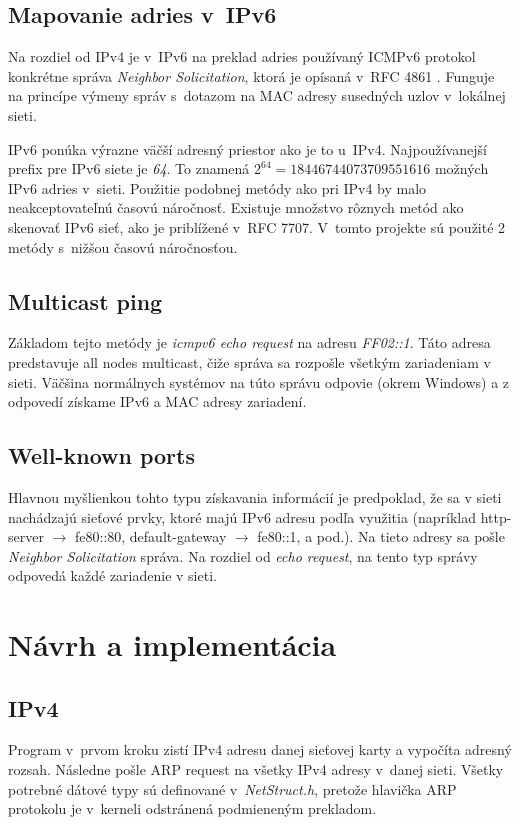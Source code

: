 \documentclass[a4paper, 11pt]{article}
\begin{document}
\subsection{Mapovanie adries v~IPv6}
Na rozdiel od IPv4 je v~IPv6 na preklad adries používaný ICMPv6 protokol konkrétne správa \emph{Neighbor Solicitation}, ktorá je opísaná v~RFC 4861 \cite{ns}. Funguje na princípe výmeny správ s~dotazom na MAC adresy susedných uzlov v~lokálnej sieti. 

IPv6 ponúka výrazne väčší adresný priestor ako je to u~IPv4. Najpoužívanejší prefix pre IPv6 siete je \emph{64}. To znamená $2^{64} = 18446744073709551616$ možných IPv6 adries v~sieti. Použitie podobnej metódy ako pri IPv4 by malo neakceptovateľnú časovú náročnosť. Existuje množstvo rôznych metód ako skenovať IPv6 sieť, ako je priblížené v~RFC 7707. \cite{net_rec} V~tomto projekte sú použité 2 metódy s~nižšou časovú náročnosťou.

\subsection{Multicast ping}
Základom tejto metódy je \emph{icmpv6 echo request} na adresu \emph{FF02::1}. Táto adresa predstavuje all nodes multicast, čiže správa sa rozpošle všetkým zariadeniam v sieti. \cite{multicast} Väčšina normálnych systémov na túto správu odpovie (okrem Windows) a z odpovedí získame IPv6 a MAC adresy zariadení.

\subsection{Well-known ports}  
Hlavnou myšlienkou tohto typu získavania informácií je predpoklad, že sa v sieti nachádzajú sieťové prvky, ktoré majú IPv6 adresu podľa využitia (napríklad http-server $\rightarrow$ fe80::80, default-gateway $\rightarrow$ fe80::1, a pod.).
Na tieto adresy sa pošle \emph{Neighbor Solicitation} správa. Na rozdiel od \emph{echo request}, na tento typ správy odpovedá každé zariadenie v sieti.



\section{Návrh a implementácia}


\subsection{IPv4}
Program v~prvom kroku zistí IPv4 adresu danej sieťovej karty a vypočíta adresný rozsah. Následne pošle ARP request na všetky IPv4 adresy v~danej sieti. Všetky potrebné dátové typy sú definované v~\emph{NetStruct.h}, pretože hlavička ARP protokolu je v~kerneli odstránená podmieneným prekladom.
\end{document}
